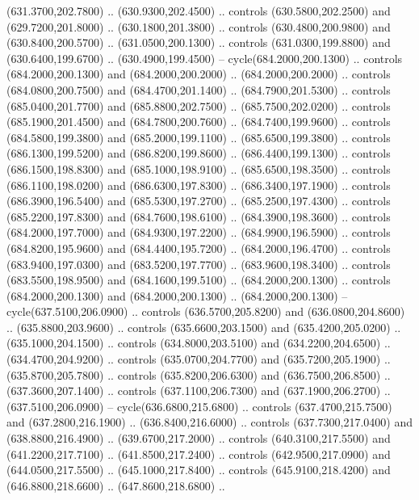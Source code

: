 {\begin{scope}[y=0.80pt, x=0.80pt, yscale=-1, xscale=1, inner sep=0pt, outer sep=0pt, #1]
      (631.3700,202.7800) .. (630.9300,202.4500) .. controls (630.5800,202.2500) and
      (629.7200,201.8000) .. (630.1800,201.3800) .. controls (630.4800,200.9800) and
      (630.8400,200.5700) .. (631.0500,200.1300) .. controls (631.0300,199.8800) and
      (630.6400,199.6700) .. (630.4900,199.4500) -- cycle(684.2000,200.1300) ..
      controls (684.2000,200.1300) and (684.2000,200.2000) .. (684.2000,200.2000) ..
      controls (684.0800,200.7500) and (684.4700,201.1400) .. (684.7900,201.5300) ..
      controls (685.0400,201.7700) and (685.8800,202.7500) .. (685.7500,202.0200) ..
      controls (685.1900,201.4500) and (684.7800,200.7600) .. (684.7400,199.9600) ..
      controls (684.5800,199.3800) and (685.2000,199.1100) .. (685.6500,199.3800) ..
      controls (686.1300,199.5200) and (686.8200,199.8600) .. (686.4400,199.1300) ..
      controls (686.1500,198.8300) and (685.1000,198.9100) .. (685.6500,198.3500) ..
      controls (686.1100,198.0200) and (686.6300,197.8300) .. (686.3400,197.1900) ..
      controls (686.3900,196.5400) and (685.5300,197.2700) .. (685.2500,197.4300) ..
      controls (685.2200,197.8300) and (684.7600,198.6100) .. (684.3900,198.3600) ..
      controls (684.2000,197.7000) and (684.9300,197.2200) .. (684.9900,196.5900) ..
      controls (684.8200,195.9600) and (684.4400,195.7200) .. (684.2000,196.4700) ..
      controls (683.9400,197.0300) and (683.5200,197.7700) .. (683.9600,198.3400) ..
      controls (683.5500,198.9500) and (684.1600,199.5100) .. (684.2000,200.1300) ..
      controls (684.2000,200.1300) and (684.2000,200.1300) .. (684.2000,200.1300) --
      cycle(637.5100,206.0900) .. controls (636.5700,205.8200) and
      (636.0800,204.8600) .. (635.8800,203.9600) .. controls (635.6600,203.1500) and
      (635.4200,205.0200) .. (635.1000,204.1500) .. controls (634.8000,203.5100) and
      (634.2200,204.6500) .. (634.4700,204.9200) .. controls (635.0700,204.7700) and
      (635.7200,205.1900) .. (635.8700,205.7800) .. controls (635.8200,206.6300) and
      (636.7500,206.8500) .. (637.3600,207.1400) .. controls (637.1100,206.7300) and
      (637.1900,206.2700) .. (637.5100,206.0900) -- cycle(636.6800,215.6800) ..
      controls (637.4700,215.7500) and (637.2800,216.1900) .. (636.8400,216.6000) ..
      controls (637.7300,217.0400) and (638.8800,216.4900) .. (639.6700,217.2000) ..
      controls (640.3100,217.5500) and (641.2200,217.7100) .. (641.8500,217.2400) ..
      controls (642.9500,217.0900) and (644.0500,217.5500) .. (645.1000,217.8400) ..
      controls (645.9100,218.4200) and (646.8800,218.6600) .. (647.8600,218.6800) ..

\end{scope}}

